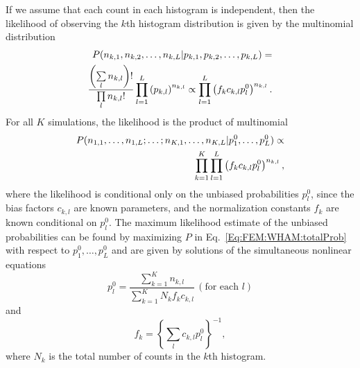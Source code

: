 If we assume that each count in each histogram is independent, then the likelihood of observing the $k$th histogram distribution is given by the multinomial distribution
\begin{align}
P(n_{k,1},n_{k,2},\dots,n_{k,L}|p_{k,1},p_{k,2},\dots,p_{k,L})=\notag\\
\frac{\left(\sum\limits_l n_{k,l}\right)!}{\prod\limits_l n_{k,l}!}\prod\limits_{l=1}^L\left(p_{k,l}\right)^{n_{k,l}}\propto\prod\limits_{l=1}^{L}\left(f_kc_{k,l}p_l^0\right)^{n_{k,l}}.
\end{align}
For all $K$ simulations, the likelihood is the product of multinomial
\begin{align}
P(n_{1,1},\dots,n_{1,L};\dots;n_{K,1},\dots,n_{K,L}|p_1^0,\dots,p_L^0)\propto\notag\\
\prod\limits_{k=1}^K\prod\limits_{l=1}^{L}\left(f_kc_{k,l}p_l^0\right)^{n_{k,l}},
\label{Eq:FEM:WHAM:totalProb}
\end{align}
where the likelihood is conditional only on the unbiased probabilities $p_l^0$, since the bias factors $c_{k,l}$ are known parameters, and the normalization constants $f_k$ are known conditional on $p_l^0$. The maximum likelihood estimate of the unbiased probabilities can be found by maximizing $P$ in Eq.~\ref{Eq:FEM:WHAM:totalProb} with respect to $p_1^0,\dots,p_L^0$ and are given by solutions of the simultaneous nonlinear equations
\begin{equation}
p_l^0=\frac{\sum\limits_{k=1}^K n_{k,l}}{\sum\limits_{k=1}^K N_kf_kc_{k,l}}\, (\text{for each }l)
\end{equation}
and
\begin{equation}
f_k={\left\{\sum\limits_lc_{k,l}p_l^0\right\}}^{-1},
\end{equation}
where $N_k$ is the total number of counts in the $k$th histogram.
